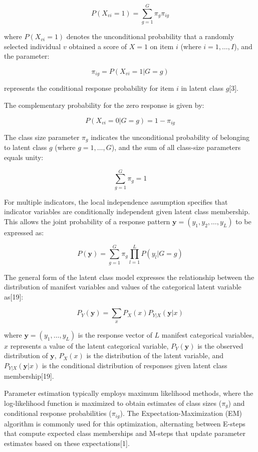 \documentclass[main.tex]{subfiles}
\begin{document}
$$P(X_{vi} = 1) = \sum_{g=1}^{G} \pi_{g} \pi_{ig}$$

where $P(X_{vi} = 1)$ denotes the unconditional probability that a randomly selected individual $v$ obtained a score of $X = 1$ on item $i$ (where $i = 1, \ldots, I$), and the parameter:

$$\pi_{ig} = P(X_{vi} = 1 | G = g)$$

represents the conditional response probability for item $i$ in latent class $g$[3].

The complementary probability for the zero response is given by:

$$P(X_{vi} = 0 | G = g) = 1 - \pi_{ig}$$

The class size parameter $\pi_g$ indicates the unconditional probability of belonging to latent class $g$ (where $g = 1, \ldots, G$), and the sum of all class-size parameters equals unity:

$$\sum_{g=1}^{G} \pi_{g} = 1$$

For multiple indicators, the local independence assumption specifies that indicator variables are conditionally independent given latent class membership. This allows the joint probability of a response pattern $\mathbf{y} = (y_1, y_2, \ldots, y_L)$ to be expressed as:

$$P(\mathbf{y}) = \sum_{g=1}^{G} \pi_g \prod_{l=1}^{L} P(y_l | G = g)$$

The general form of the latent class model expresses the relationship between the distribution of manifest variables and values of the categorical latent variable as[19]:

$$P_Y(\mathbf{y}) = \sum_{x} P_X(x) P_{Y|X}(\mathbf{y}|x)$$

where $\mathbf{y} = (y_1, \ldots, y_L)$ is the response vector of $L$ manifest categorical variables, $x$ represents a value of the latent categorical variable, $P_Y(\mathbf{y})$ is the observed distribution of $\mathbf{y}$, $P_X(x)$ is the distribution of the latent variable, and $P_{Y|X}(\mathbf{y}|x)$ is the conditional distribution of responses given latent class membership[19].

Parameter estimation typically employs maximum likelihood methods, where the log-likelihood function is maximized to obtain estimates of class sizes ($\pi_g$) and conditional response probabilities ($\pi_{ig}$). The Expectation-Maximization (EM) algorithm is commonly used for this optimization, alternating between E-steps that compute expected class memberships and M-steps that update parameter estimates based on these expectations[1].
\end{document}
